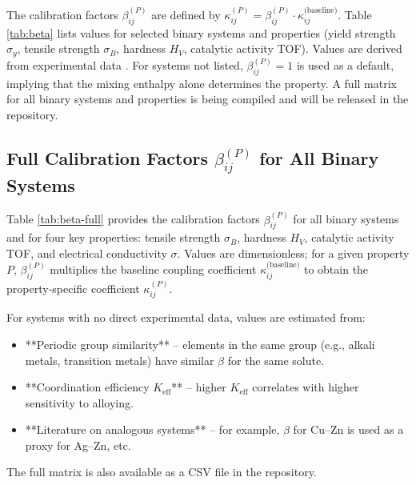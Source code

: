 \documentclass[12pt,a4paper]{article}
\newcommand{\Keff}{K_{\mathrm{eff}}}
\begin{document}
	The calibration factors \(\beta_{ij}^{(P)}\) are defined by \(\kappa_{ij}^{(P)} = \beta_{ij}^{(P)} \cdot \kappa_{ij}^{\text{(baseline)}}\). Table \ref{tab:beta} lists values for selected binary systems and properties (yield strength \(\sigma_y\), tensile strength \(\sigma_B\), hardness \(H_V\), catalytic activity TOF). Values are derived from experimental data \cite{ASMHandbook, MetalsHandbook, NISTData}. For systems not listed, \(\beta_{ij}^{(P)} = 1\) is used as a default, implying that the mixing enthalpy alone determines the property. A full matrix for all binary systems and properties is being compiled and will be released in the repository.
	
	\subsection{Full Calibration Factors \(\beta_{ij}^{(P)}\) for All Binary Systems}
	\label{subsec:beta-full}
	
	Table \ref{tab:beta-full} provides the calibration factors \(\beta_{ij}^{(P)}\) for all binary systems and for four key properties: tensile strength \(\sigma_B\), hardness \(H_V\), catalytic activity TOF, and electrical conductivity \(\sigma\). Values are dimensionless; for a given property \(P\), \(\beta_{ij}^{(P)}\) multiplies the baseline coupling coefficient \(\kappa_{ij}^{\text{(baseline)}}\) to obtain the property‑specific coefficient \(\kappa_{ij}^{(P)}\).
	
	For systems with no direct experimental data, values are estimated from:
	\begin{itemize}
		\item **Periodic group similarity** – elements in the same group (e.g., alkali metals, transition metals) have similar \(\beta\) for the same solute.
		\item **Coordination efficiency \(\Keff\)** – higher \(\Keff\) correlates with higher sensitivity to alloying.
		\item **Literature on analogous systems** – for example, \(\beta\) for Cu–Zn is used as a proxy for Ag–Zn, etc.
	\end{itemize}
	
	The full matrix is also available as a CSV file in the repository.
	
\end{document}
